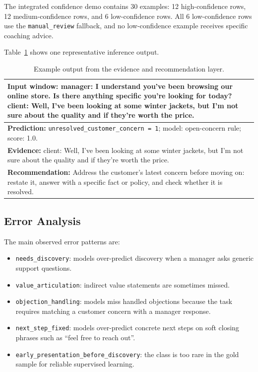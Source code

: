 \documentclass{article}
\begin{document}
The integrated confidence demo contains 30 examples: 12 high-confidence rows, 12 medium-confidence rows, and 6 low-confidence rows. All 6 low-confidence rows use the \texttt{manual\_review} fallback, and no low-confidence example receives specific coaching advice.

Table~\ref{tab:output} shows one representative inference output.

\begin{table}[!tbh]
    \centering
    \begin{tabularx}{0.96\linewidth}{>{\raggedright\arraybackslash}X}
        \toprule
        \textbf{Input window:} \newline
        manager: I understand you've been browsing our online store. Is there anything specific you're looking for today? \newline
        client: Well, I've been looking at some winter jackets, but I'm not sure about the quality and if they're worth the price. \\
        \midrule
        \textbf{Prediction:} \texttt{unresolved\_customer\_concern = 1}; model: open-concern rule; score: 1.0. \\
        \midrule
        \textbf{Evidence:} client: Well, I've been looking at some winter jackets, but I'm not sure about the quality and if they're worth the price. \\
        \midrule
        \textbf{Recommendation:} Address the customer's latest concern before moving on: restate it, answer with a specific fact or policy, and check whether it is resolved. \\
        \bottomrule
    \end{tabularx}
    \caption{Example output from the evidence and recommendation layer.}
    \label{tab:output}
\end{table}

\subsection{Error Analysis}
The main observed error patterns are:
\begin{itemize}
    \item \texttt{needs\_discovery}: models over-predict discovery when a manager asks generic support questions.
    \item \texttt{value\_articulation}: indirect value statements are sometimes missed.
    \item \texttt{objection\_handling}: models miss handled objections because the task requires matching a customer concern with a manager response.
    \item \texttt{next\_step\_fixed}: models over-predict concrete next steps on soft closing phrases such as ``feel free to reach out''.
    \item \texttt{early\_presentation\_before\_discovery}: the class is too rare in the gold sample for reliable supervised learning.
\end{itemize}
\end{document}
